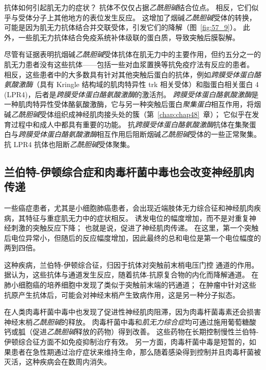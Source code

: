 抗体如何引起肌无力的症状？
抗体不仅仅占据\textit{乙酰胆碱}结合位点。
相反，它们似乎与受体分子上其他地方的表位发生反应。
这增加了烟碱\textit{乙酰胆碱}受体的转换，可能是因为肌无力抗体结合并交联受体，引发它们的降解（图~\ref{fig:57_9}）。
此外，一些肌无力抗体结合免疫系统补体级联的蛋白质，导致突触后膜裂解。


尽管有证据表明抗烟碱\textit{乙酰胆碱}受体抗体在肌无力中的主要作用，但约五分之一的肌无力患者没有这些抗体——包括一些对血浆置换等抗免疫疗法有反应的患者。
相反，这些患者中的大多数具有针对其他突触后蛋白的抗体，例如\textit{跨膜受体蛋白酪氨酸激酶}（具有 Kringle 结构域的肌肉特异性 trk 相关受体）和脂蛋白相关蛋白 4 (LPR4)，后者是\textit{跨膜受体蛋白酪氨酸激酶}的激活剂。
\textit{跨膜受体蛋白酪氨酸激酶}是一种肌肉特异性受体酪氨酸激酶，它与另一种突触后蛋白\textit{聚集蛋白}相互作用，将烟碱\textit{乙酰胆碱}受体组织成神经肌肉接头处的簇（第~\ref{chap:chap48}~章）；
它似乎在发育过程中和成人中都具有重要的功能。
抗\textit{跨膜受体蛋白酪氨酸激酶}抗体在集聚蛋白与\textit{跨膜受体蛋白酪氨酸激酶}相互作用后阻断烟碱\textit{乙酰胆碱}受体的一些正常聚集。
抗 LPR4 抗体也阻断\textit{乙酰胆碱}受体聚集。



\subsection{兰伯特-伊顿综合症和肉毒杆菌中毒也会改变神经肌肉传递}

一些癌症患者，尤其是小细胞肺癌患者，会出现近端肢体无力综合征和神经肌肉疾病，其特征与重症肌无力中的症状相反。
诱发电位的幅度增加，而不是对重复神经刺激的突触反应下降；
也就是说，促进了神经肌肉传递。
在这里，第一个突触后电位异常小，但随后的反应幅度增加，因此最终的总和电位是第一个电位幅度的两到四倍。


这种疾病，兰伯特-伊顿综合征，归因于抗体对突触前末梢电压门控  通道的作用。
据认为，这些抗体与通道发生反应，随着抗体-抗原复合物的内化而降解通道。
在肺小细胞癌的培养细胞中发现了类似于突触前末端的钙通道；
在肿瘤中针对这些抗原产生抗体后，可能会对神经末梢产生致病作用，这是另一种分子拟态。


在人类肉毒杆菌中毒中也发现了促进性神经肌肉阻滞，因为肉毒杆菌毒素还会损害神经末梢\textit{乙酰胆碱}的释放。
肉毒杆菌中毒和\textit{肌无力综合症}均可通过施用葡萄糖酸钙或胍（促进\textit{乙酰胆碱}释放的药物）得到改善。
这些药物在长期控制慢性兰伯特-伊顿综合征方面不如免疫抑制治疗有效。
另一方面，肉毒杆菌中毒是短暂的，如果患者在急性期通过治疗症状来维持生命，那么随着感染得到控制并且肉毒杆菌被灭活，这种疾病会在数周内消失。



